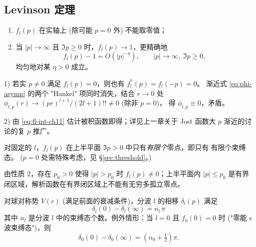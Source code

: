 \subsection{Levinson 定理}\label{ssec:levinson}

\begin{theorem}\label{thm:fl-properties}
\hfill
\begin{enumerate}
\item $f_l(p)$ 在实轴上 (除可能 $p=0$ 外) 不能取零值；
\item 当 $|p|\to\infty$ 且 $\Im p\geq 0$ 时，$f_l(p)\to 1$，更精确地
\begin{equation}
f_l(p)-1 = O(|p|^{-\eta}),\qquad |p|\to\infty,\ \Im p\geq 0,
\label{eq:fl-large}
\end{equation}
均匀地对某 $\eta>0$ 成立。
\end{enumerate}
\end{theorem}

\begin{proof*}
1) 若实 $p\neq 0$ 满足 $f_l(p)=0$，则也有 $f_l^*(p)=f_l(-p)=0$。
渐近式 \eqref{eq:phi-asymp} 的两个 "Hankel" 项同时消失，结合
$r\to 0$ 处 $\phi_{l,p}(r)\to (pr)^{l+1}/(2l+1)!!\neq 0$ (除非 $p=0$)，
得 $\phi_{l,p}\equiv 0$，矛盾。

2) 由 \eqref{eq:fl-int-ch11} 估计被积函数即得；详见上一章关于 Jost 函数大 $p$
渐近的讨论的复 $p$ 推广。
\end{proof*}

\begin{corollary}[束缚态有限性]\label{cor:bound-finite}
对固定的 $l$，$f_l(p)$ 在上半平面 $\Im p>0$ 中只有\emph{有限个}零点，即只有
有限个束缚态。 ($p=0$ 处需特殊考虑，见 \S\ref{sec:threshold}。)
\end{corollary}

\begin{proof*}
由性质 2，存在 $p_0>0$ 使得 $|p|>p_0$ 时 $f_l(p)\neq 0$；上半平面内 $|p|\leq p_0$
是有界闭区域，解析函数在有界闭区域上不能有无穷多孤立零点。
\end{proof*}

\begin{theorem}[Levinson 定理]\label{thm:levinson}
对球对称势 $V(r)$ (满足前面的衰减条件)，分波 $l$ 的相移 $\delta_l(p)$ 满足
\begin{equation}
\boxed{\;\delta_l(0)-\delta_l(\infty) = n_l\,\pi\;}
\label{eq:levinson}
\end{equation}
其中 $n_l$ 是分波 $l$ 中的束缚态个数。例外情形：当 $l=0$ 且 $f_0(0)=0$ 时
("零能 s 波束缚态")，则
\begin{equation}
\delta_0(0)-\delta_0(\infty) = (n_0+\tfrac{1}{2})\pi.
\label{eq:levinson-exc}
\end{equation}
\end{theorem}


